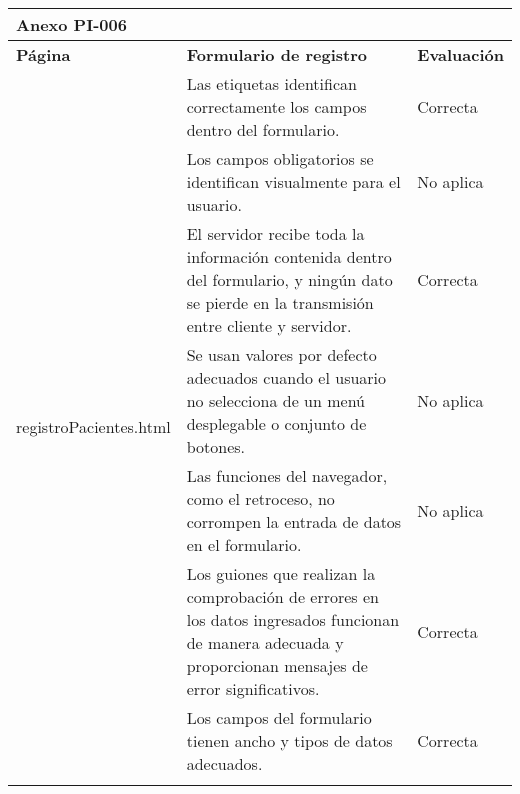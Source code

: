 \begin{table}[htpb]
\centering
\begin{tabularx}{\textwidth}{|l|X|l|}
\hline
\multicolumn{3}{|l|}{\textbf{Anexo PI-006}}                                                                                                                                                                                 \\ \hline
\textbf{Página}                          & \textbf{Formulario de registro}                                                                                                                           & \textbf{Evaluación} \\ \hline
\multirow{10}{*}{registroPacientes.html} & Las etiquetas identifican correctamente los campos dentro del formulario.                                                                                 & Correcta            \\ \cline{2-3} 
                                         & Los campos obligatorios se identifican visualmente para el usuario.                                                                                       & No aplica           \\ \cline{2-3} 
                                         & El servidor recibe toda la información contenida dentro del formulario, y ningún dato se pierde en la transmisión entre cliente y servidor.               & Correcta            \\ \cline{2-3} 
                                         & Se usan valores por defecto adecuados cuando el usuario no selecciona de un menú desplegable o conjunto de botones.                                       & No aplica           \\ \cline{2-3} 
                                         & Las funciones del navegador, como el retroceso, no corrompen la entrada de datos en el formulario.                                                        & No aplica           \\ \cline{2-3} 
                                         & Los guiones que realizan la comprobación de errores en los datos ingresados funcionan de manera adecuada y proporcionan mensajes de error significativos. & Correcta            \\ \cline{2-3} 
                                         & Los campos del formulario tienen ancho y tipos de datos adecuados.                                                                                        & Correcta            \\ \cline{2-3} 

\end{tabularx}
\end{table}
